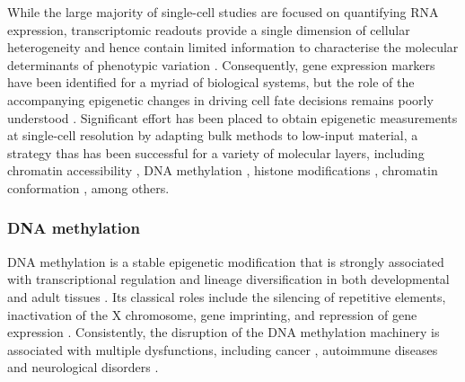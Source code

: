 While the large majority of single-cell studies are focused on quantifying RNA expression, transcriptomic readouts provide a single dimension of cellular heterogeneity and hence contain limited information to characterise the molecular determinants of phenotypic variation \cite{Ritchie2015}. Consequently, gene expression markers have been identified for a myriad of biological systems, but the role of the accompanying epigenetic changes in driving cell fate decisions remains poorly understood \cite{Griffiths2018,Kelsey2017,Bheda2014}. Significant effort has been placed to obtain epigenetic measurements at single-cell resolution by adapting bulk methods to low-input material, a strategy thas has been successful for a variety of molecular layers, including chromatin accessibility \cite{Cusanovich2015,Cao2018,Chen2018}, DNA methylation \cite{Smallwood2014}, histone modifications \cite{Ku2019}, chromatin conformation \cite{Ku2019}, among others.

\subsubsection{DNA methylation} \label{section:dna_methylation}

DNA methylation is a stable epigenetic modification that is strongly associated with transcriptional regulation and lineage diversification in both developmental and adult tissues \cite{Jin2018, Harrison2011, Lee2014, Smith2013}. Its classical roles include the silencing of repetitive elements, inactivation of the X chromosome, gene imprinting, and repression of gene expression \cite{Jones2012}. Consistently, the disruption of the DNA methylation machinery is associated with multiple dysfunctions, including cancer \cite{Baylin2011}, autoimmune diseases \cite{Liu2013} and neurological disorders \cite{Amir1999}.

